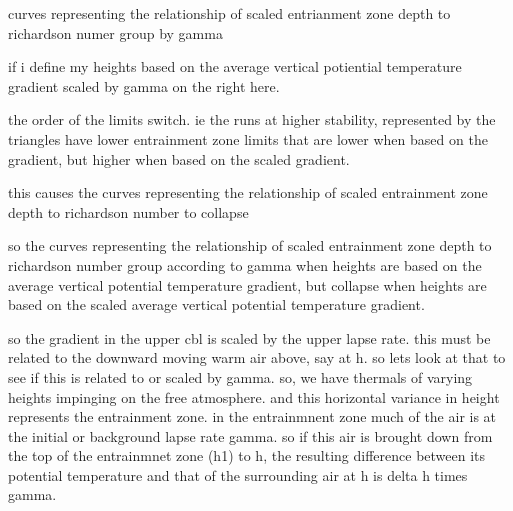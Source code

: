 \documentclass{beamer}
\newcommand\FrameText[1]{
\begin{textblock}{16}(1,2.5)
\raggedright #1
\end{textblock}}
\begin{document}
\begin{frame}
curves representing the relationship of scaled entrianment zone depth to richardson numer group by gamma
\end{frame}

\begin{frame}
if i define my heights based on the average vertical potiential temperature gradient scaled by gamma on the right here.\\
\end{frame}

\begin{frame}
the order of the limits switch.  ie the runs at higher stability, represented by the triangles have lower entrainment zone limits that are lower when based on the gradient, but higher when based on the scaled gradient.
\end{frame}

\begin{frame}
this causes the curves representing the relationship of scaled entrainment zone depth to richardson number to collapse\\
\end{frame}

\begin{frame}
so the curves representing the relationship of scaled entrainment zone depth to richardson number group according to gamma when heights are based on the average vertical potential temperature gradient, but collapse when heights are based on the scaled average vertical potential temperature gradient.
\end{frame}


\begin{frame}
so the gradient in the upper cbl is scaled by the upper lapse rate.  this must be related to the downward moving warm air above, say at h.  so lets look at that to see if this is related to or scaled by gamma.  so, we have thermals of varying heights impinging on the free atmosphere.  and this horizontal variance in height represents the entrainment zone.  in the entrainmnent zone much of the air is at the initial or background lapse rate gamma.  so if this air is brought down from the top of the entrainmnet zone (h1) to h, the resulting difference between its potential temperature and that of the surrounding air at h is delta h times gamma. 
\end{frame}
\end{document}
